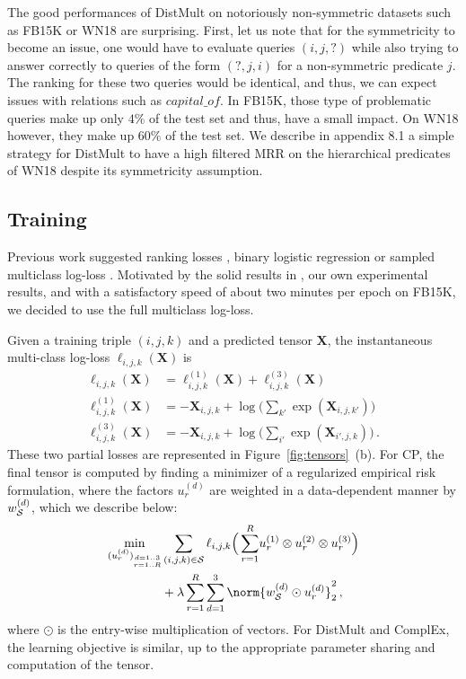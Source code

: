\documentclass{article}
\newcommand{\tensor}[1]{{\bm #1}}
\newcommand{\CP}{{CP}\xspace}
\newcommand{\complex}{{ComplEx}\xspace}
\newcommand{\distmult}{{DistMult}\xspace}
\newcommand{\fb}{{FB15K}\xspace}
\newcommand{\wn}{{WN18}\xspace}
\newcommand{\tens}[1]{\tensor{#1}}
\newcommand{\tensi}[2]{\tensor{#1}_{#2}}
\newcommand{\rkv}{r}
\newcommand{\rk}{R}
\newcommand{\dv}{d}
\newcommand{\unkn}{X}
\newcommand{\indices}{{\cal S}}
\newcommand{\loss}{\ell}
\newcommand{\facv}[2]{u^{(#1)}_{#2}}
\newcommand{\weightv}[1]{w_{\indices}^{(#1)}}
\begin{document}
The good performances of \distmult on notoriously non-symmetric datasets such as \fb or \wn are surprising. First, let us note that for the symmetricity to become an issue, one would have to evaluate queries $(i, j, ?)$ while also trying to answer correctly to queries of the form $(?, j, i)$ for a non-symmetric predicate $j$. The ranking for these two queries would be identical, and thus, we can expect issues with relations such as $capital\_of$. In \fb, those type of problematic queries make up only $4\%$ of the test set and thus, have a small impact. On \wn however, they make up $60\%$ of the test set. We describe in appendix 8.1 a simple strategy for \distmult to have a high filtered MRR on the hierarchical predicates of \wn despite its symmetricity assumption.


\subsection{Training}
Previous work suggested ranking losses \citep{bordes_translating_2013}, binary logistic regression \citep{trouillon_complex_2016} or sampled multiclass log-loss \citep{kadlec_knowledge_2017}. Motivated by the solid results in \citet{joulin2017fast}, our own experimental results, and with a satisfactory speed of about two minutes per epoch on \fb, we decided to use the full multiclass log-loss. 

Given a training triple $(i,j,k)$ and a predicted tensor $\tens{\unkn}$, the instantaneous multi-class log-loss $\loss_{i,j,k}(\tens{\unkn})$ is
\begin{align}
\label{eq:fiberloss}
\loss_{i,j,k}(\tens{\unkn}) & = \loss^{(1)}_{i,j,k}(\tens{\unkn}) + \loss^{(3)}_{i,j,k}(\tens{\unkn}) \\
\loss^{(1)}_{i,j,k}(\tens{\unkn}) &  =-\tensi{\unkn}{i,j,k} + \log \big ( \sum_{k'\!} \exp (\tensi{\unkn}{i,j,k'\!}) \big )\\
\loss^{(3)}_{i,j,k}(\tens{\unkn}) & = -\tensi{\unkn}{i,j,k} + \log \big ( \sum_{i'\!} \exp (\tensi{\unkn}{i',j,k\!}) \big )\,.
\end{align}
These two partial losses are represented in Figure~\ref{fig:tensors}~(b).
For \CP, the final tensor is computed by finding a minimizer of a regularized empirical risk formulation, where the factors $\facv{\dv}{\rkv}$ are weighted in a data-dependent manner by $\weightv{\dv}$, which we describe below: 
\begin{align}
\label{eq:mainprob}
\min_{(\facv{\dv}{\rkv})_{
\substack{\scriptscriptstyle \dv=1..3\\\scriptscriptstyle\rkv=1..\rk}}}
&\sum_{(i,j,k)\in\indices}
\loss_{i,j,k}\Big(\sum\limits_{\rkv=1}^\rk \!\facv{1}{\rkv} \otimes \facv{2}{\rkv}\otimes\facv{3}{\rkv}\Big) \nonumber \\
&+\lambda\sum_{\rkv=1}^\rk \sum_{\dv=1}^3 \norm{\weightv{\dv}\odot\facv{\dv}{\rkv}}_2^2\,, 
\end{align}
where $\odot$ is the entry-wise multiplication of vectors. 
For \distmult and \complex, the learning objective is similar, up to the appropriate parameter sharing and computation of the tensor.
\end{document}

